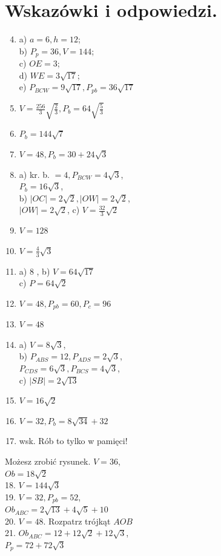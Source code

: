 \documentclass[10pt]{article}
\begin{document}
\section*{Wskazówki i odpowiedzi.}
\begin{enumerate}
  \setcounter{enumi}{3}
  \item a) \(a=6, h=12\);\\
b) \(P_{p}=36, V=144\);\\
c) \(O E=3\);\\
d) \(W E=3 \sqrt{17}\);\\
e) \(P_{B C W}=9 \sqrt{17}, P_{p b}=36 \sqrt{17}\)
  \item \(V=\frac{256}{3} \sqrt{\frac{2}{3}}, P_{b}=64 \sqrt{\frac{5}{3}}\)
  \item \(P_{b}=144 \sqrt{7}\)
  \item \(V=48, P_{b}=30+24 \sqrt{3}\)
  \item a) kr. b. \(=4, P_{B C W}=4 \sqrt{3}\),\\
\(P_{b}=16 \sqrt{3}\),\\
b) \(|O C|=2 \sqrt{2},|O W|=2 \sqrt{2}\),\\
\(|O W|=2 \sqrt{2}\), c) \(V=\frac{32}{3} \sqrt{2}\)
  \item \(V=128\)
  \item \(V=\frac{4}{3} \sqrt{3}\)
  \item a) 8 , b) \(V=64 \sqrt{17}\)\\
c) \(P=64 \sqrt{2}\)
  \item \(V=48, P_{p b}=60, P_{c}=96\)
  \item \(V=48\)
  \item a) \(V=8 \sqrt{3}\),\\
b) \(P_{A B S}=12, P_{A D S}=2 \sqrt{3}\),\\
\(P_{C D S}=6 \sqrt{3}, P_{B C S}=4 \sqrt{3}\),\\
c) \(|S B|=2 \sqrt{13}\)
  \item \(V=16 \sqrt{2}\)
  \item \(V=32, P_{b}=8 \sqrt{34}+32\)
  \item wsk. Rób to tylko w pamięci!
\end{enumerate}

Możesz zrobić rysunek. \(V=36\),\\
\(O b=18 \sqrt{2}\)\\
18. \(V=144 \sqrt{3}\)\\
19. \(V=32, P_{p b}=52\),\\
\(O b_{A B C}=2 \sqrt{13}+4 \sqrt{5}+10\)\\
20. \(V=48\). Rozpatrz trójkąt \(A O B\)\\
21. \(O b_{A B C}=12+12 \sqrt{2}+12 \sqrt{3}\),\\
\(P_{p}=72+72 \sqrt{3}\)
\end{document}
